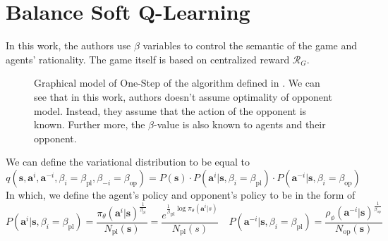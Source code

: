 \section{Balance Soft Q-Learning \cite{grau2018balancing}}
In this work, the authors use $\beta$ variables to control the semantic of the game and agents' rationality. The game itself is based on centralized reward $\mathcal{R}_G$.  
\begin{figure}[ht]
    \begin{minipage}[t]{0.5\linewidth}
    \centering
    \label{Balancing-Graphical}
    \end{minipage}%
    \begin{minipage}[t]{0.5\linewidth}
    Graphical model of One-Step of the algorithm defined in  \cite{grau2018balancing}. We can see that in this work, authors doesn't assume optimality of opponent model. Instead, they assume that the action of the opponent is known. Further more, the $\beta$-value is also known to agents and their opponent.
    \end{minipage}
\end{figure}
We can define the variational distribution to be equal to 
\begin{equation}
     q(\boldsymbol{s}, \boldsymbol{a}^i, \boldsymbol{a}^{-i}, \beta_i = \beta_{\text{pl}}, \beta_{-i} = \beta_{\text{op}}) = P(\boldsymbol{s}) \cdot P(\boldsymbol{a}^i | \boldsymbol{s}, \beta_i = \beta_{\text{pl}}) \cdot P(\boldsymbol{a}^{-i} | \boldsymbol{s}, \beta_i = \beta_{\text{op}})
\end{equation}
In which, we define the agent's policy and opponent's policy to be in the form of
\begin{equation}\label{balance-pol-op}
     P(\boldsymbol{a}^i | \boldsymbol{s}, \beta_i = \beta_{\text{pl}}) = \frac{\pi_{\theta}(\boldsymbol{a}^i |\boldsymbol{s})^{\frac{1}{\beta_{\text{pl}}}}}{N_{\text{pl}}(\boldsymbol{s})} = \frac{e^{\frac{1}{\beta}_{\text{pl}} \log \pi_{\theta}(\boldsymbol{a}^i | s)} }{N_{\text{pl}}(s)} \quad P(\boldsymbol{a}^{-i} | \boldsymbol{s}, \beta_i = \beta_{\text{pl}}) = \frac{\rho_{\phi}(\boldsymbol{a}^{-i} |\boldsymbol{s})^{\frac{1}{\beta_{\text{op}}}}}{N_{\text{op}}(\boldsymbol{s})}
\end{equation}
